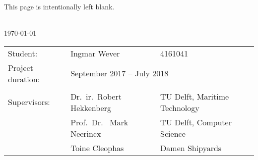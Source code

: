 {	%
	\clearpage
	\thispagestyle{empty}
	\vspace*{6cm}
	\begin{center}
		This page is intentionally left blank.
	\end{center}

	\begin{titlepage}
		\newpage
		\setcounter{page}{0}
		
		\centering
		\Large
		\vspace*{3cm}
		\doctitle\\
		\large
		\vspace{1cm}
		\today
		
		\vspace{7cm}
		\normalsize
		\begin{tabular}{lll}
			Student: & Ingmar Wever & 4161041 \\
			Project duration: & \multicolumn{2}{l}{September 2017 -- July 2018} \\
			& & \\
			Supervisors: & Dr.\ ir.\ Robert Hekkenberg & TU Delft, Maritime Technology \\
			& Prof.\ Dr. \ Mark Neerincx & TU Delft, Computer Science \\
			& Toine Cleophas & Damen Shipyards
		\end{tabular}

\end{titlepage}
		
}
	